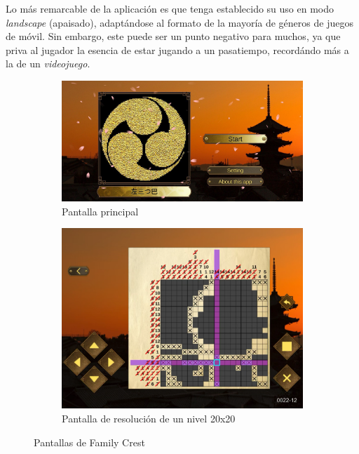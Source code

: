  Lo más remarcable de la aplicación es que tenga establecido su uso en modo \textit{landscape} (apaisado), adaptándose al formato de la mayoría de géneros
 de juegos de móvil. Sin embargo, este puede ser un punto negativo para muchos, ya que priva al jugador la esencia de estar jugando a un pasatiempo,
 recordándo más a la de un \textit{videojuego}.

 \begin{figure}[h!]
  \centering
  \begin{subfigure}[b]{0.49\linewidth}
    \includegraphics[width=\linewidth]{images/familycrest1.jpg}
    \caption{Pantalla principal}
    \label{fig:family1-1}
  \end{subfigure}
  \begin{subfigure}[b]{0.49\linewidth}
    \includegraphics[width=\linewidth]{images/familycrest2.png}
    \caption{Pantalla de resolución de un nivel 20x20}
    \label{fig:family1-2}
  \end{subfigure}
  \caption{Pantallas de Family Crest}
  \label{fig:family1}
\end{figure}

